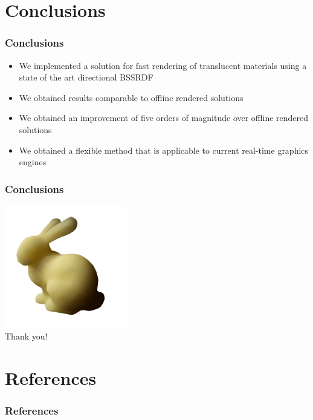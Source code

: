 \documentclass{beamer}
\begin{document}
\section{Conclusions}
\begin{frame}
    \frametitle{Conclusions}

\begin{itemize}
\item We implemented a solution for fast rendering of translucent materials using a state of the art directional BSSRDF
\item We obtained results comparable to offline rendered solutions
\item We obtained an improvement of five orders of magnitude over offline rendered solutions
\item We obtained a flexible method that is applicable to current real-time graphics engines
\end{itemize}

\end{frame}

\begin{frame}
    \frametitle{Conclusions}
\centering
\includegraphics[width=0.4\textwidth]{front} \\
\huge Thank you!
\end{frame}

\section{References}

\begin{frame}
    \frametitle{References}
 
\end{frame}
\end{document}

